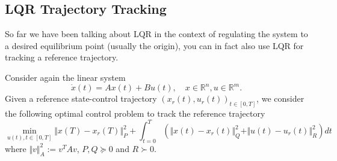 \documentclass[
]{book}
\theoremstyle{definition}
\theoremstyle{definition}
\theoremstyle{definition}
\theoremstyle{definition}
\theoremstyle{remark}
\begin{document}
\hypertarget{lqr-trajectory-tracking-1}{%
\subsection{LQR Trajectory Tracking}\label{lqr-trajectory-tracking-1}}

So far we have been talking about LQR in the context of regulating the system to a desired equilibrium point (usually the origin), you can in fact also use LQR for tracking a reference trajectory.

Consider again the linear system
\[
\dot{x}(t) = A x (t) + B u(t), \quad x \in \mathbb{R}^n, u \in \mathbb{R}^m.
\]
Given a reference state-control trajectory \((x_r(t),u_r(t))_{t \in [0,T]}\), we consider the following optimal control problem to track the reference trajectory
\[
\min_{u(t),t \in [0,T]} \Vert x(T) - x_r(T) \Vert_P^2 + \int_{t=0}^T \left( \Vert x(t) - x_r(t) \Vert_Q^2 + \Vert u(t) - u_r(t) \Vert_R^2  \right) dt
\]
where \(\Vert v \Vert_A^2 := v^T A v\), \(P,Q\succeq 0\) and \(R \succ 0\).
\end{document}
